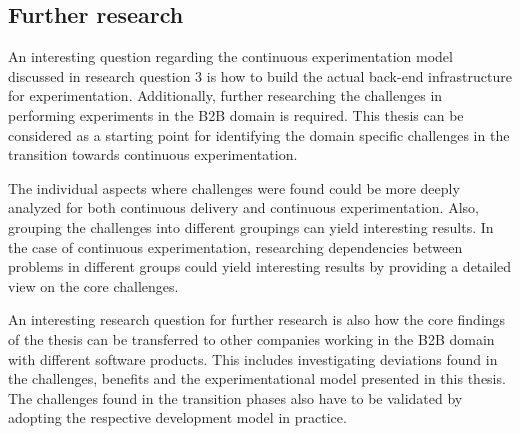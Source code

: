 \documentclass[english]{tktltiki2}
\theoremstyle{definition}
\theoremstyle{remark}
\begin{document}
\subsection{Further research}
An interesting question regarding the continuous experimentation model discussed in research question 3 is how to build the actual back-end infrastructure for experimentation. Additionally, further researching the challenges in performing experiments in the B2B domain is required. This thesis can be considered as a starting point for identifying the domain specific challenges in the transition towards continuous experimentation.

The individual aspects where challenges were found could be more deeply analyzed for both continuous delivery and continuous experimentation. Also, grouping the challenges into different groupings can yield interesting results. In the case of continuous experimentation, researching dependencies between problems in different groups could yield interesting results by providing a detailed view on the core challenges.

An interesting research question for further research is also how the core findings of the thesis can be transferred to other companies working in the B2B domain with different software products. This includes investigating deviations found in the challenges, benefits and the experimentational model presented in this thesis. The challenges found in the transition phases also have to be validated by adopting the respective development model in practice. 









\end{document}
